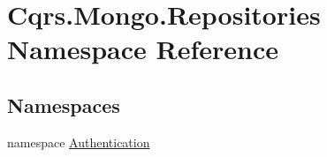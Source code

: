 \hypertarget{namespaceCqrs_1_1Mongo_1_1Repositories}{}\section{Cqrs.\+Mongo.\+Repositories Namespace Reference}
\label{namespaceCqrs_1_1Mongo_1_1Repositories}
\subsection*{Namespaces}
\begin{DoxyCompactItemize}
\item 
namespace \hyperlink{namespaceCqrs_1_1Mongo_1_1Repositories_1_1Authentication}{Authentication}
\end{DoxyCompactItemize}
